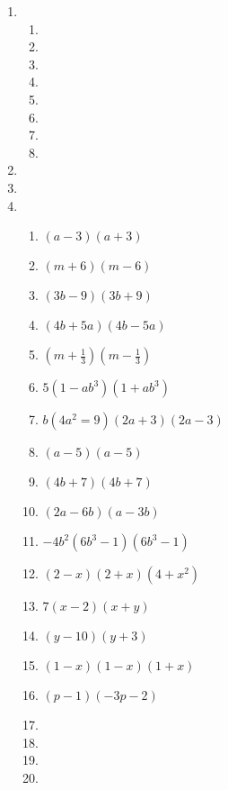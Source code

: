 {\begin{multicols}{3}
\begin{enumerate}[noitemsep, label=\textbf{\arabic*}. ]
\item %

    \begin{enumerate}[noitemsep, label=\textbf{(\alph*)} ] 
    \item %
    \item %
    \item %
    \item %
    \item %
    \item %
    \item %
    \item %
    \end{enumerate}


\item %
\item %

\item %

\begin{enumerate}[noitemsep, label=\textbf{(\alph*)} ] 
\item $(a - 3)(a + 3)$%
\item $(m + 6)(m - 6)$%
\item $(3b - 9)(3b + 9)$%
\item $(4b + 5a)(4b - 5a)$%
\item $(m +\frac{1}{3})(m -\frac{1}{3})$%
\item $5(1 - ab^3)(1 + ab^3)$%
\item $b(4a^2 = 9)(2a + 3)(2a - 3)$%
\item $(a - 5)(a - 5)$%
\item $(4b + 7)(4b + 7)$%
\item $(2a - 6b)(a - 3b)$%
\item $-4b^2(6b^3 - 1)(6b^3 - 1)$%
\item $(2 - x)(2 + x)(4 + x^2)$%
\item $7(x - 2)(x + y)$%
\item $(y - 10)(y + 3)$%
\item $(1 - x)(1 - x)(1 +x)$%
\item $(p - 1)(-3p-2)$%
\item %
\item %
\item %
\item %
\end{enumerate}



\end{enumerate}
\end{multicols}}
